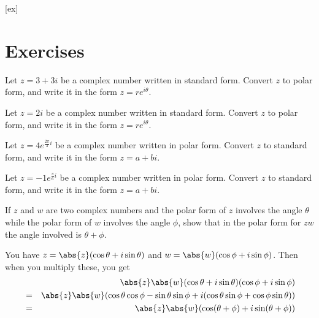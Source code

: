 [ex]
\section*{Exercises}


\begin{ex} Let $z = 3 + 3i$ be a complex number written in standard form. Convert $z$ to polar form, and write it in the form $z = re^{i\theta}$.
\end{ex}

\begin{ex} Let $z = 2i$ be a complex number written in standard form. Convert $z$ to polar form, and write it in the form $z = re^{i\theta}$.
\end{ex}

\begin{ex} Let $z = 4e^{\frac{2\pi}{3}i}$ be a complex number written in polar form. Convert $z$ to standard form, and write it in the form $z = a+bi$.
\end{ex}

\begin{ex} Let $z = -1e^{\frac{\pi}{6}i}$ be a complex number written in polar form. Convert $z$ to standard form, and write it in the form $z = a+bi$.
\end{ex}

\begin{ex} If $z$ and $w$ are two complex numbers and the polar form of $z$
involves the angle $\theta $ while the polar form of $w$ involves the angle 
$\phi$, show that in the polar form for $zw$ the angle involved is $\theta
+\phi$. 
\begin{sol}
 You have $z=\abs{z}(\cos
\theta +i\sin \theta) $ and $w=\abs{w}(\cos
\phi +i\sin \phi)$. Then when you multiply these, you get
\begin{eqnarray*}
&&\abs{z}\abs{w}(\cos \theta +i\sin
\theta) (\cos \phi +i\sin \phi) \\
&=&\abs{z}\abs{w}(\cos \theta \cos
\phi -\sin \theta \sin \phi +i(\cos \theta \sin \phi +\cos \phi \sin
\theta)) \\
&=&\abs{z}\abs{w}(\cos (\theta
+\phi) +i\sin (\theta +\phi))
\end{eqnarray*}
\end{sol}
\end{ex}

